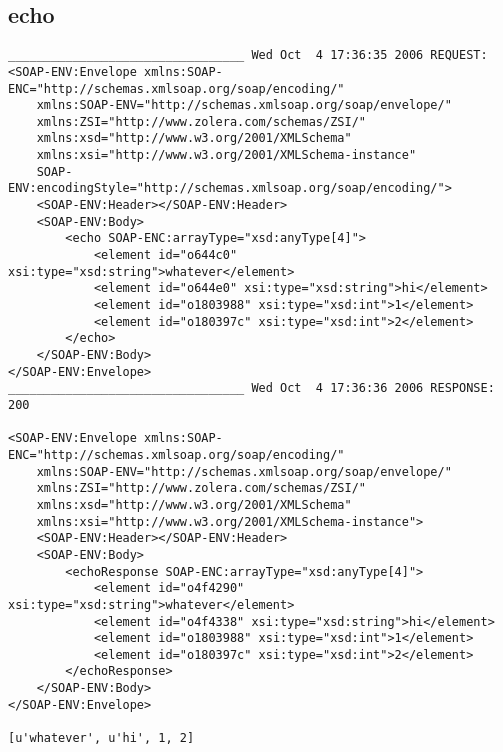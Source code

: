 \subsection{echo}
\begin{verbatim}
_________________________________ Wed Oct  4 17:36:35 2006 REQUEST:
<SOAP-ENV:Envelope xmlns:SOAP-ENC="http://schemas.xmlsoap.org/soap/encoding/"
	xmlns:SOAP-ENV="http://schemas.xmlsoap.org/soap/envelope/"
	xmlns:ZSI="http://www.zolera.com/schemas/ZSI/"
	xmlns:xsd="http://www.w3.org/2001/XMLSchema"
	xmlns:xsi="http://www.w3.org/2001/XMLSchema-instance"
	SOAP-ENV:encodingStyle="http://schemas.xmlsoap.org/soap/encoding/">
	<SOAP-ENV:Header></SOAP-ENV:Header>
	<SOAP-ENV:Body>
		<echo SOAP-ENC:arrayType="xsd:anyType[4]">
			<element id="o644c0" xsi:type="xsd:string">whatever</element>
			<element id="o644e0" xsi:type="xsd:string">hi</element>
			<element id="o1803988" xsi:type="xsd:int">1</element>
			<element id="o180397c" xsi:type="xsd:int">2</element>
		</echo>
	</SOAP-ENV:Body>
</SOAP-ENV:Envelope>
_________________________________ Wed Oct  4 17:36:36 2006 RESPONSE:
200

<SOAP-ENV:Envelope xmlns:SOAP-ENC="http://schemas.xmlsoap.org/soap/encoding/"
	xmlns:SOAP-ENV="http://schemas.xmlsoap.org/soap/envelope/"
	xmlns:ZSI="http://www.zolera.com/schemas/ZSI/"
	xmlns:xsd="http://www.w3.org/2001/XMLSchema"
	xmlns:xsi="http://www.w3.org/2001/XMLSchema-instance">
	<SOAP-ENV:Header></SOAP-ENV:Header>
	<SOAP-ENV:Body>
		<echoResponse SOAP-ENC:arrayType="xsd:anyType[4]">
			<element id="o4f4290" xsi:type="xsd:string">whatever</element>
			<element id="o4f4338" xsi:type="xsd:string">hi</element>
			<element id="o1803988" xsi:type="xsd:int">1</element>
			<element id="o180397c" xsi:type="xsd:int">2</element>
		</echoResponse>
	</SOAP-ENV:Body>
</SOAP-ENV:Envelope>

[u'whatever', u'hi', 1, 2]
\end{verbatim}

